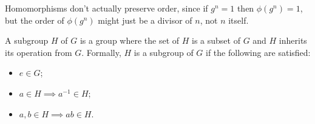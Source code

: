 \begin{corollary}
Homomorphisms don't actually preserve order, since if $g^n = 1$ then $\phi(g^n) = 1$, but the order of $\phi(g^n)$ might just be a divisor of $n$, not $n$ itself.
\end{corollary}

\begin{definition}[Subgroup]
A subgroup $H$ of $G$ is a group where the set of $H$ is a subset of $G$
 and $H$ inherits its operation from $G$. Formally, $H$ is a subgroup of $G$ if the following are satisfied:
 \begin{itemize}
 \item $e \in G$;
 \item $a \in H \implies a^{-1} \in H$;
 \item $a,b \in H \implies ab \in H$.
 \end{itemize}
\end{definition}